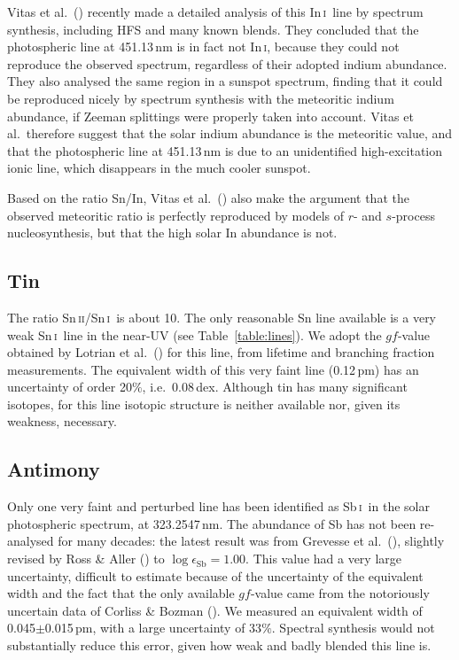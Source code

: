 \documentclass[traditabstract]{aa}
\newcommand{\altsni}{Sn\,\textsc{i}}
\newcommand{\altsnii}{Sn\,\textsc{ii}}
\newcommand{\altini}{In\,\textsc{i}}
\newcommand{\altsbi}{Sb\,\textsc{i}}
\newcommand{\sni}{\altsni\ }
\newcommand{\ini}{\altini\ }
\newcommand{\sbi}{\altsbi\ }
\begin{document}
Vitas et al.\ (\cite{vita}) recently made a detailed analysis of this \ini line by spectrum synthesis, including HFS and many known blends.  They concluded that the photospheric line at 451.13\,nm is in fact not \altini, because they could not reproduce the observed spectrum, regardless of their adopted indium abundance.  They also analysed the same region in a sunspot spectrum, finding that it could be reproduced nicely by spectrum synthesis with the meteoritic indium abundance, if Zeeman splittings were properly taken into account. Vitas et al.\ therefore suggest that the solar indium abundance is the meteoritic value, and that the photospheric line at 451.13\,nm is due to an unidentified high-excitation ionic line, which disappears in the much cooler sunspot.

Based on the ratio Sn/In, Vitas et al.\ (\cite{vita}) also make the argument that the observed meteoritic ratio is perfectly reproduced by models of $r$- and $s$-process nucleosynthesis, but that the high solar In abundance is not.

\subsection{Tin}
The ratio \altsnii/\sni is about 10.  The only reasonable Sn line available is a very weak \sni line in the near-UV (see Table~\ref{table:lines}).  We adopt the $gf$-value obtained by Lotrian et al.\ (\cite{lotri}) for this line, from lifetime and branching fraction measurements.  The equivalent width of this very faint line (0.12\,pm) has an uncertainty of order 20$\%$, i.e.\ 0.08\,dex.  Although tin has many significant isotopes, for this line isotopic structure is neither available nor, given its weakness, necessary.

\subsection{Antimony}
Only one very faint and perturbed line has been
identified as \sbi in the solar photospheric spectrum, at 323.2547\,nm. The
abundance of Sb has not been re-analysed for many decades: the
latest result was from Grevesse et al.\ (\cite{grev2}), slightly revised
by Ross \& Aller (\cite{ross3}) to $\log\epsilon_{\mathrm{Sb}}=1.00$.
This value had a very large uncertainty, difficult to estimate because of the
uncertainty of the equivalent width and the fact that the only available $gf$-value came from
the notoriously uncertain data of Corliss \& Bozman (\cite{corl}). We measured 
an equivalent width of 0.045$\pm$0.015\,pm, with a large uncertainty of 33$\%$.
Spectral synthesis would not substantially reduce this error, given how weak and
badly blended this line is.
\end{document}
